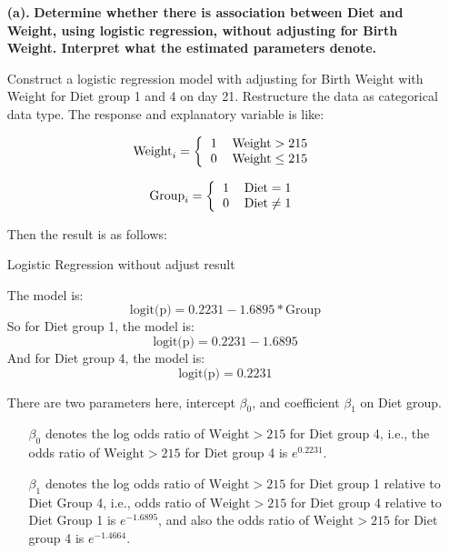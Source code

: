 \documentclass[10pt,letterpaper]{article}
\begin{document}
\begin{enumerate}[leftmargin=0cm,itemindent=.5cm,labelwidth=\itemindent,labelsep=0cm,align=left]
\item[\textbf{(a).} ] \textbf{Determine whether there is association between Diet and Weight, using logistic regression, without adjusting for Birth Weight. Interpret what the estimated parameters denote.}

Construct a logistic regression model with adjusting for Birth Weight with Weight for Diet group 1 and 4 on day 21. Restructure the data as categorical data type. The response and explanatory variable is like:\\
\begin{multicols}{2}
\[\text{Weight}_i=  
\left \{
  \begin{tabular}{cc}
  1 &  $\text{Weight}>215$\\
  0 &  $\text{Weight} \leq 215$\\
  \end{tabular}
\right.
\]

\[\text{Group}_i=  
\left \{
  \begin{tabular}{cc}
  1 &  $\text{Diet}=1$\\
  0 &  $\text{Diet} \neq 1$ \\
  \end{tabular}
\right.
\]
\end{multicols}
Then the result is as follows:
\begin{center}
Logistic Regression without adjust result

\end{center}
The model is:
\[\text{logit(p)} =0.2231-1.6895*\text{Group} \]
So for Diet group 1, the model is:
\[\text{logit(p)} = 0.2231-1.6895\]
And for Diet group 4, the model is:
\[\text{logit(p)} = 0.2231\]

There are two parameters here, intercept $\beta_0$, and coefficient $\beta_1$ on Diet group.
\begin{enumerate}[leftmargin=0cm,itemindent=.5cm,labelwidth=\itemindent,labelsep=0cm,align=left]
\item[\textbullet] $\beta_0$ denotes the log odds ratio of $\text{Weight}>215$ for Diet group 4, i.e., the odds ratio of $\text{Weight}>215$  for Diet group 4 is $e^0.2231$.
\item[\textbullet] $\beta_1$ denotes the log odds ratio of $\text{Weight}>215$ for Diet group 1 relative to Diet Group 4, i.e., odds ratio of $\text{Weight}>215$  for Diet group 4 relative to Diet Group 1 is $e^{-1.6895}$,
and also the odds ratio of $\text{Weight}>215$ for Diet group 4 is $e^{-1.4664}$.\\


\end{enumerate}
\end{enumerate}
\end{document}
